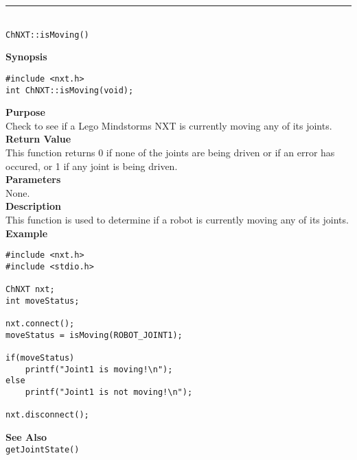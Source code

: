 \noindent
\vspace{5pt}
\rule{4.5in}{0.015in}\\
\noindent
{\LARGE \texttt{ChNXT::isMoving()} }\\


\noindent
{\bf Synopsis}
\vspace{-8pt}
\begin{verbatim}
#include <nxt.h>
int ChNXT::isMoving(void);
\end{verbatim}

\noindent
{\bf Purpose}\\
Check to see if a Lego Mindstorms NXT is currently moving any of its joints.\\

\noindent
{\bf Return Value}\\
This function returns 0 if none of the joints are being driven or 
if an error has occured, or 1 if any joint is being driven.\\

\noindent
{\bf Parameters}\\
None.\\

\noindent
{\bf Description}\\
This function is used to determine if a robot is currently moving any of its joints.\\

\noindent
{\bf Example}
\begin{verbatim}
#include <nxt.h>
#include <stdio.h>

ChNXT nxt;
int moveStatus;

nxt.connect();
moveStatus = isMoving(ROBOT_JOINT1);

if(moveStatus)
    printf("Joint1 is moving!\n");
else
    printf("Joint1 is not moving!\n");

nxt.disconnect();
\end{verbatim}

\noindent
{\bf See Also}\\
\texttt{getJointState()}\\
